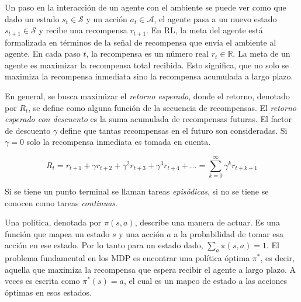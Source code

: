 

 Un paso en la interacción de un agente con el ambiente se puede ver como que dado un estado $s_t \in \mathcal{S}$ y un
acción $a_t\in \mathcal{A}$, el agente pasa a un nuevo
estado $s_{t+1} \in \mathcal{S}$ y recibe una recompensa
$r_{t+1}$.
En RL, la meta del agente está formalizada
en términos de la señal de recompensa que
envía el ambiente al agente. En cada paso $t$, la recompensa es un número real $r_t \in \mathbb{R}$. La meta de un agente
es maximizar la recompensa total recibida.
Esto significa, que no solo se maximiza la recompensa inmediata sino la recompensa acumulada a largo plazo.

En general, se busca maximizar el \textit{retorno
esperado}, donde el retorno, denotado por $R_t$, se define como alguna función de la secuencia de recompensas. 
El \textit{retorno esperado con descuento} es la suma acumulada de recompensas futuras. El factor de descuento $\gamma$
define que tantas recompensas en el 
futuro son consideradas. Si $\gamma = 0$
solo la recompensa inmediata es
tomada en cuenta.

\[
R_t = r_{t+1} + \gamma r_{t+2} + \gamma^2 r_{t+3} + \gamma^3 r_{t+4} + \dots = 
\sum_{k = 0}^\infty \gamma^{k} r_{t+k+1}
\]

Si se tiene un punto terminal se llaman tareas \textit{episódicas}, si no se tiene se conocen como tareas \textit{continuas}.


Una política, denotada por $\pi(s, a)$, describe una manera de actuar. Es una función que mapea un estado $s$ y una acción $a$ a la probabilidad de tomar esa acción en ese estado.
Por lo tanto para un estado dado, 
$\sum_a \pi (s, a) = 1$. El problema fundamental en los MDP es encontrar una política óptima $\pi^*$, es decir, aquella que maximiza la recompensa que espera recibir el agente a largo plazo.
A veces es escrita como $\pi^*(s) = a$, el cual es un mapeo de estado a las acciones óptimas en esos estados.

